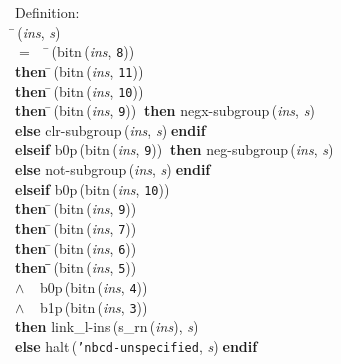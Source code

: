 \begin{tabbing}{\sc Definition}: \\  
\=\,({\it{ins\/}}, {\it{s\/}}) \\ 
$=$$\;\;\;\;$\=\,({\rm{bitn}}\,({\it{ins\/}}, {\tt{8}})) \\ 
{\bf then }\=\,({\rm{bitn}}\,({\it{ins\/}}, {\tt{11}})) \\ 
{\bf then }\=\,({\rm{bitn}}\,({\it{ins\/}}, {\tt{10}})) \\ 
{\bf then }\=\,({\rm{bitn}}\,({\it{ins\/}}, {\tt{9}}))$\;\;${\bf then }{\rm{negx-subgroup}}\,({\it{ins\/}}, {\it{s\/}}) \\ 
{\bf else }{\rm{clr-subgroup}}\,({\it{ins\/}}, {\it{s\/}})$\;${\bf  endif}\- \\ 
{\bf elseif }{\rm{b0p}}\,({\rm{bitn}}\,({\it{ins\/}}, {\tt{9}}))$\;\;${\bf then }{\rm{neg-subgroup}}\,({\it{ins\/}}, {\it{s\/}}) \\ 
{\bf else }{\rm{not-subgroup}}\,({\it{ins\/}}, {\it{s\/}})$\;${\bf  endif}\- \\ 
{\bf elseif }{\rm{b0p}}\,({\rm{bitn}}\,({\it{ins\/}}, {\tt{10}})) \\ 
{\bf then }\=\,({\rm{bitn}}\,({\it{ins\/}}, {\tt{9}})) \\ 
{\bf then }\=\,({\rm{bitn}}\,({\it{ins\/}}, {\tt{7}})) \\ 
{\bf then }\=\,({\rm{bitn}}\,({\it{ins\/}}, {\tt{6}})) \\ 
{\bf then }\=\=\,({\rm{bitn}}\,({\it{ins\/}}, {\tt{5}})) \\ 
$\wedge$$\;\;\;\;${\rm{b0p}}\,({\rm{bitn}}\,({\it{ins\/}}, {\tt{4}})) \\ 
$\wedge$$\;\;\;\;${\rm{b1p}}\,({\rm{bitn}}\,({\it{ins\/}}, {\tt{3}}))\- \\ 
{\bf then }{\rm{link\_l-ins}}\,({\rm{s\_rn}}\,({\it{ins\/}}), {\it{s\/}}) \\ 
{\bf else }{\rm{halt}}\,({\tt{'}}{\tt{nbcd-unspecified}}, {\it{s\/}})$\;${\bf  endif}\- \\ 
$$
\end{tabbing}
